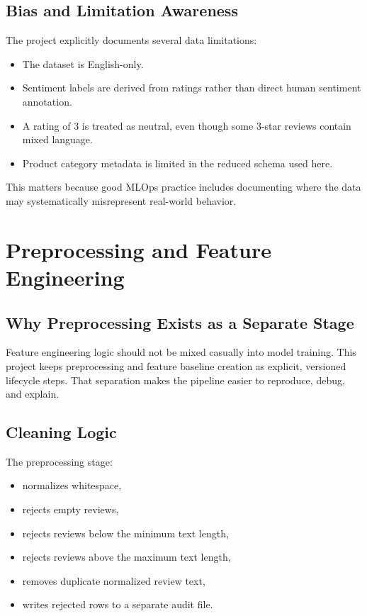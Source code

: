 \documentclass[11pt,a4paper]{article}
\begin{document}
\subsection{Bias and Limitation Awareness}

The project explicitly documents several data limitations:

\begin{itemize}[leftmargin=1.4em]
  \item The dataset is English-only.
  \item Sentiment labels are derived from ratings rather than direct human sentiment annotation.
  \item A rating of 3 is treated as neutral, even though some 3-star reviews contain mixed language.
  \item Product category metadata is limited in the reduced schema used here.
\end{itemize}

This matters because good MLOps practice includes documenting where the data may systematically misrepresent real-world behavior.

\section{Preprocessing and Feature Engineering}

\subsection{Why Preprocessing Exists as a Separate Stage}

Feature engineering logic should not be mixed casually into model training. This project keeps preprocessing and feature baseline creation as explicit, versioned lifecycle steps. That separation makes the pipeline easier to reproduce, debug, and explain.

\subsection{Cleaning Logic}

The preprocessing stage:

\begin{itemize}[leftmargin=1.4em]
  \item normalizes whitespace,
  \item rejects empty reviews,
  \item rejects reviews below the minimum text length,
  \item rejects reviews above the maximum text length,
  \item removes duplicate normalized review text,
  \item writes rejected rows to a separate audit file.
\end{itemize}
\end{document}
